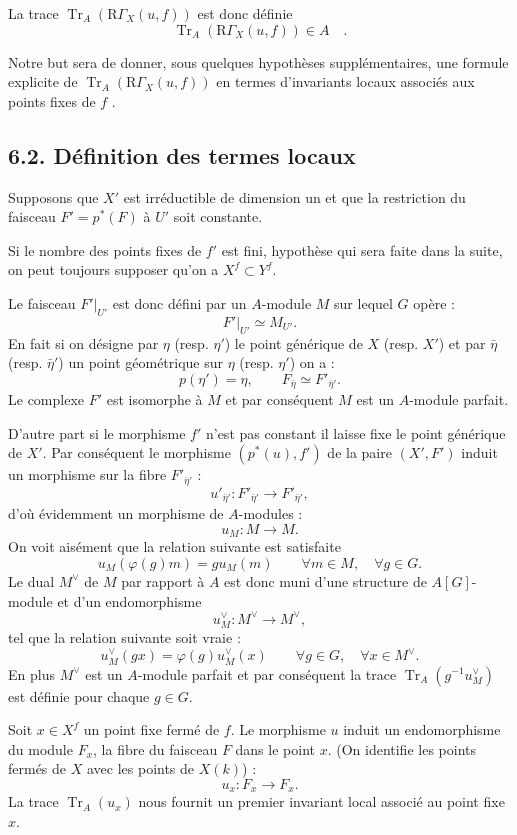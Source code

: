 \documentclass[11pt]{article}
\newcommand{\R}{\mathrm{R}}\newcommand{\RHomCore}{\mathrm{RHom}}
\providecommand{\Tr}{\operatorname{Tr}}
\providecommand{\Tr}{\operatorname{Tr}}
\providecommand{\Tr}{\operatorname{Tr}}
\providecommand{\R}{\mathrm R}
\providecommand{\Tr}{\operatorname{Tr}}
\providecommand{\Tr}{\operatorname{Tr}}
\begin{document}
La trace $\Tr_A(\R\Gamma_X(u, f))$ est donc définie
\[
\Tr_A(\R\Gamma_X(u, f)) \in A \quad .
\]

Notre but sera de donner, sous quelques hypothèses supplémentaires, une formule explicite de $\Tr_A(\R\Gamma_X(u, f))$ en termes d'invariants locaux associés aux points fixes de $f$ .

\bigskip

\subsection*{6.2. Définition des termes locaux}
Supposons que $X'$ est irréductible de dimension un et que la restriction du faisceau $F'=p^*(F)$ à $U'$ soit constante.

Si le nombre des points fixes de $f'$ est fini, hypothèse qui sera faite dans la suite, on peut toujours supposer qu'on a $X^f \subset Y^f$.

Le faisceau $F'|_{U'}$ est donc défini par un $A$-module $M$ sur lequel $G$ opère :
\[
F'|_{U'} \simeq M_{U'} .
\]
En fait si on désigne par $\eta$ (resp. $\eta'$) le point générique de $X$ (resp. $X'$) et par $\bar\eta$ (resp. $\bar\eta'$) un point géométrique sur $\eta$ (resp. $\eta'$) on a :
\[
p(\eta')=\eta,\qquad F_{\bar\eta} \simeq F'_{\bar\eta'} .
\]
Le complexe $F'$ est isomorphe à $M$ et par conséquent $M$ est un $A$-module parfait.

D'autre part si le morphisme $f'$ n'est pas constant il laisse fixe le point générique de $X'$. Par conséquent le morphisme $(p^*(u),f')$ de la paire $(X',F')$ induit un morphisme sur la fibre $F'_{\bar\eta'}$ :
\[
u'_{\bar\eta'}:F'_{\bar\eta'}\longrightarrow F'_{\bar\eta'} ,
\]
d'où évidemment un morphisme de $A$-modules :
\[
u_M:M\longrightarrow M .
\]
On voit aisément que la relation suivante est satisfaite
\begin{equation}\tag{6.2.1}
u_M(\varphi(g)m)=g u_M(m) \qquad \forall m\in M,\quad \forall g\in G .
\end{equation}
Le dual $M^\vee$ de $M$ par rapport à $A$ est donc muni d'une structure de $A[G]$-module et d'un endomorphisme
\[
u_M^\vee:M^\vee\longrightarrow M^\vee ,
\]
tel que la relation suivante soit vraie :
\[
u_M^\vee(gx)=\varphi(g)u_M^\vee(x) \qquad \forall g\in G,\quad \forall x\in M^\vee .
\]
En plus $M^\vee$ est un $A$-module parfait et par conséquent la trace $\Tr_A(g^{-1}u_M^\vee)$ est définie pour chaque $g\in G$.

Soit $x\in X^f$ un point fixe fermé de $f$. Le morphisme $u$ induit un endomorphisme du module $F_x$, la fibre du faisceau $F$ dans le point $x$. (On identifie les points fermés de $X$ avec les points de $X(k)$) :
\[
u_x:F_x\longrightarrow F_x .
\]
La trace $\Tr_A(u_x)$ nous fournit un premier invariant local associé au point fixe $x$.
\end{document}
